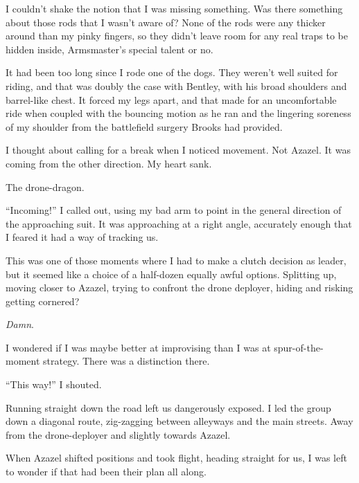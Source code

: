 I couldn't shake the notion that I was missing something.  Was there something about those rods that I wasn't aware of?  None of the rods were any thicker around than my pinky fingers, so they didn't leave room for any real traps to be hidden inside, Armsmaster's special talent or no.



It had been too long since I rode one of the dogs.  They weren't well suited for riding, and that was doubly the case with Bentley, with his broad shoulders and barrel-like chest.  It forced my legs apart, and that made for an uncomfortable ride when coupled with the bouncing motion as he ran and the lingering soreness of my shoulder from the battlefield surgery Brooks had provided.



I thought about calling for a break when I noticed movement.  Not Azazel.  It was coming from the other direction.  My heart sank.



The drone-dragon.



``Incoming!''  I called out, using my bad arm to point in the general direction of the approaching suit.  It was approaching at a right angle, accurately enough that I feared it had a way of tracking us.



This was one of those moments where I had to make a clutch decision as leader, but it seemed like a choice of a half-dozen equally awful options.  Splitting up, moving closer to Azazel, trying to confront the drone deployer, hiding and risking getting cornered?



\emph{Damn}.



I wondered if I was maybe better at improvising than I was at spur-of-the-moment strategy.   There was a distinction there.



``This way!''  I shouted.



Running straight down the road left us dangerously exposed.  I led the group down a diagonal route, zig-zagging between alleyways and the main streets.  Away from the drone-deployer and slightly towards Azazel.



When Azazel shifted positions and took flight, heading straight for us, I was left to wonder if that had been their plan all along.




